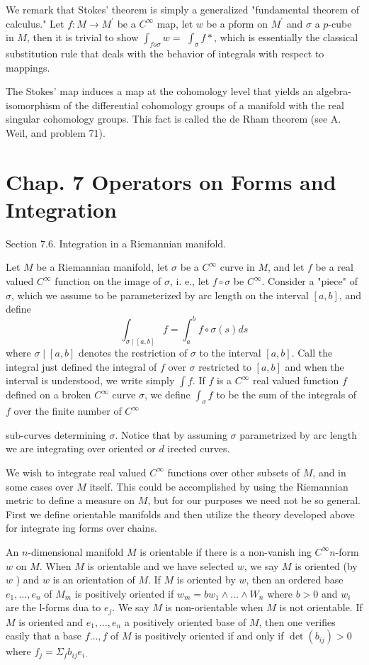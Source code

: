 \documentclass[10pt]{article}
\begin{document}
We remark that Stokes' theorem is simply a generalized "fundamental theorem of calculus." Let $f: M \rightarrow M^{\prime}$ be a $C^{\infty}$ map, let $w$ be a pform on $M^{\prime}$ and $\sigma$ a $p$-cube in $M$, then it is trivial to show $\int_{f o \sigma} w=$ $\int_{\sigma} f *$, which is essentially the classical substitution rule that deals with the behavior of integrals with respect to mappings.

The Stokes' map induces a map at the cohomology level that yields an algebra-isomorphism of the differential cohomology groups of a manifold with the real singular cohomology groups. This fact is called the de Rham theorem (see A. Weil, and problem 71).

\section{Chap. 7 Operators on Forms and Integration}
Section 7.6. Integration in a Riemannian manifold.

Let $M$ be a Riemannian manifold, let $\sigma$ be a $C^{\infty}$ curve in $M$, and let $f$ be a real valued $C^{\infty}$ function on the image of $\sigma$, i. e., let $f \circ \sigma$ be $C^{\infty}$. Consider a "piece" of $\sigma$, which we assume to be parameterized by arc length on the interval $[a, b]$, and define
$$
\int_{\sigma \mid[a, b]} f=\int_{a}^{b} f \circ \sigma(s) d s
$$
where $\sigma \mid[a, b]$ denotes the restriction of $\sigma$ to the interval $[a, b]$. Call the integral just defined the integral of $f$ over $\sigma$ restricted to $[a, b]$ and when the interval is understood, we write simply $\int f .$ If $f$ is a $C^{\infty}$ real valued function $f$ defined on a broken $C^{\infty}$ curve $\sigma$, we define $\int_{\sigma} f$ to be the sum of the integrals of $f$ over the finite number of $C^{\infty}$

sub-curves determining $\sigma$. Notice that by assuming $\sigma$ parametrized by arc length we are integrating over oriented or $d$ irected curves.

We wish to integrate real valued $C^{\infty}$ functions over other subsets of $M$, and in some cases over $M$ itself. This could be accomplished by using the Riemannian metric to define a measure on $M$, but for our purposes we need not be so general. First we define orientable manifolds and then utilize the theory developed above for integrate ing forms over chains.

An $n$-dimensional manifold $M$ is orientable if there is a non-vanish ing $C^{\infty} n$-form $w$ on $M$. When $M$ is orientable and we have selected $w$, we say $M$ is oriented (by $w$ ) and $w$ is an orientation of $M$. If $M$ is oriented by $w$, then an ordered base $e_{1}, \ldots, e_{n}$ of $M_{m}$ is positively oriented if $w_{m}=b w_{1} \wedge \ldots \wedge W_{n}$ where $b>0$ and $w_{i}$ are the l-forms dua to $e_{j} .$ We say $M$ is non-orientable when $M$ is not orientable. If $M$ is oriented and $e_{1}, \ldots, e_{n}$ a positively oriented base of $M$, then one verifies easily that a base $f \ldots, f$ of $M$ is positively oriented if and only if $\operatorname{det}\left(b_{i j}\right)>0$ where $f_{j}=\Sigma_{f} b_{i j} e_{i \cdot}$
\end{document}
